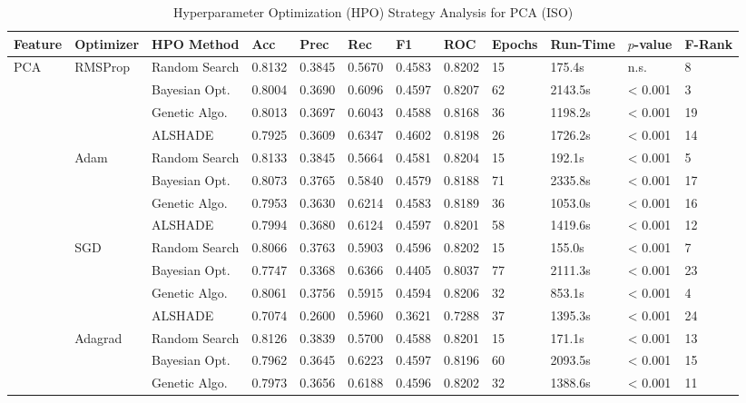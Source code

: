 \documentclass[conference]{IEEEtran}
\begin{document}
\begin{table}[t]
\centering
\scriptsize
\caption{Hyperparameter Optimization (HPO) Strategy Analysis for PCA (ISO)}
\label{tab:opt_pca_iso}
\begin{tabular}{llllllllllll}
\toprule 
\textbf{Feature} & \textbf{Optimizer} & \textbf{HPO Method} & \textbf{Acc} & \textbf{Prec} & \textbf{Rec} & \textbf{F1} & \textbf{ROC} & \textbf{Epochs} & \textbf{Run-Time} & \textbf{$p$-value} & \textbf{F-Rank}  \\
\midrule
\multirow{24}{*}{ PCA} & \multirow{4}{*}{ RMSProp} & Random Search & 0.8132 & 0.3845 & 0.5670 & 0.4583 & 0.8202 & 15 & 175.4s & n.s. & 8 \\
 &  & Bayesian Opt. & 0.8004 & 0.3690 & 0.6096 & 0.4597 & 0.8207 & 62 & 2143.5s & < 0.001 & 3 \\
 &  & Genetic Algo. & 0.8013 & 0.3697 & 0.6043 & 0.4588 & 0.8168 & 36 & 1198.2s & < 0.001 & 19 \\
 &  & ALSHADE & 0.7925 & 0.3609 & 0.6347 & 0.4602 & 0.8198 & 26 & 1726.2s & < 0.001 & 14 \\
\cline{2-12}
 & \multirow{4}{*}{ Adam} & Random Search & 0.8133 & 0.3845 & 0.5664 & 0.4581 & 0.8204 & 15 & 192.1s & < 0.001 & 5 \\
 &  & Bayesian Opt. & 0.8073 & 0.3765 & 0.5840 & 0.4579 & 0.8188 & 71 & 2335.8s & < 0.001 & 17 \\
 &  & Genetic Algo. & 0.7953 & 0.3630 & 0.6214 & 0.4583 & 0.8189 & 36 & 1053.0s & < 0.001 & 16 \\
 &  & ALSHADE & 0.7994 & 0.3680 & 0.6124 & 0.4597 & 0.8201 & 58 & 1419.6s & < 0.001 & 12 \\
\cline{2-12}
 & \multirow{4}{*}{ SGD} & Random Search & 0.8066 & 0.3763 & 0.5903 & 0.4596 & 0.8202 & 15 & 155.0s & < 0.001 & 7 \\
 &  & Bayesian Opt. & 0.7747 & 0.3368 & 0.6366 & 0.4405 & 0.8037 & 77 & 2111.3s & < 0.001 & 23 \\
 &  & Genetic Algo. & 0.8061 & 0.3756 & 0.5915 & 0.4594 & 0.8206 & 32 & 853.1s & < 0.001 & 4 \\
 &  & ALSHADE & 0.7074 & 0.2600 & 0.5960 & 0.3621 & 0.7288 & 37 & 1395.3s & < 0.001 & 24 \\
\cline{2-12}
 & \multirow{4}{*}{ Adagrad} & Random Search & 0.8126 & 0.3839 & 0.5700 & 0.4588 & 0.8201 & 15 & 171.1s & < 0.001 & 13 \\
 &  & Bayesian Opt. & 0.7962 & 0.3645 & 0.6223 & 0.4597 & 0.8196 & 60 & 2093.5s & < 0.001 & 15 \\
 &  & Genetic Algo. & 0.7973 & 0.3656 & 0.6188 & 0.4596 & 0.8202 & 32 & 1388.6s & < 0.001 & 11 \\

\end{tabular}
\end{table}
\end{document}

